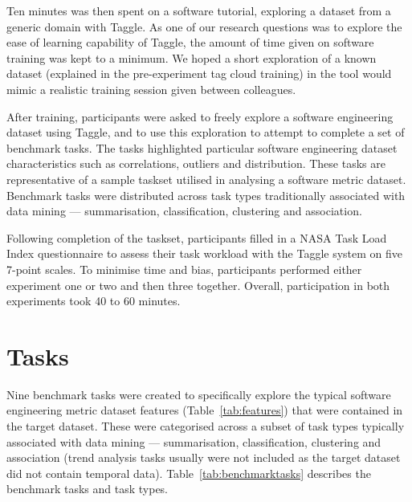 Ten minutes was then spent on a software tutorial, exploring a dataset from a generic domain with Taggle. As one of our research questions was to explore the ease of learning capability of Taggle, the amount of time given on software training was kept to a minimum. We hoped a short exploration of a known dataset (explained in the pre-experiment tag cloud training) in the tool would mimic a realistic training session given between colleagues.

After training, participants were asked to freely explore a software engineering dataset using Taggle, and to use this exploration to attempt to complete a set of benchmark tasks. The tasks highlighted particular software engineering dataset characteristics such as correlations, outliers and distribution. These tasks are representative of a sample taskset utilised in analysing a software metric dataset. Benchmark tasks were distributed across task types traditionally associated with data mining --- summarisation, classification, clustering and association.

Following completion of the taskset, participants filled in a NASA Task Load Index \citet{hart88} questionnaire to assess their task workload with the Taggle system on five 7-point scales. To minimise time and bias, participants performed either experiment one or two and then three together. Overall, participation in both experiments took 40 to 60 minutes.



\section{Tasks}\label{sect:tasks}
Nine benchmark tasks were created to specifically explore the typical software engineering metric dataset features (Table~\vref{tab:features}) that were contained in the target dataset. These were categorised across a subset of task types typically associated with data mining --- summarisation, classification, clustering and association (trend analysis tasks usually were not included as the target dataset did not contain temporal data). Table~\vref{tab:benchmarktasks} describes the benchmark tasks and task types.

